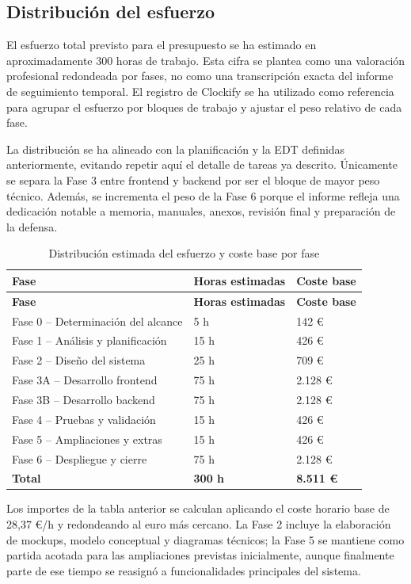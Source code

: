 \subsection{Distribución del esfuerzo}

El esfuerzo total previsto para el presupuesto se ha estimado en aproximadamente 300 horas de trabajo. Esta cifra se plantea como una valoración profesional redondeada por fases, no como una transcripción exacta del informe de seguimiento temporal. El registro de Clockify se ha utilizado como referencia para agrupar el esfuerzo por bloques de trabajo y ajustar el peso relativo de cada fase.

La distribución se ha alineado con la planificación y la EDT definidas anteriormente, evitando repetir aquí el detalle de tareas ya descrito. Únicamente se separa la Fase 3 entre frontend y backend por ser el bloque de mayor peso técnico. Además, se incrementa el peso de la Fase 6 porque el informe refleja una dedicación notable a memoria, manuales, anexos, revisión final y preparación de la defensa.

\begin{longtable}{p{6.5cm}p{3cm}p{3.5cm}}
\caption{Distribución estimada del esfuerzo y coste base por fase}\label{tab:distribucion_esfuerzo}\\
\toprule
\textbf{Fase} & \textbf{Horas estimadas} & \textbf{Coste base} \\
\midrule
\endfirsthead
\toprule
\textbf{Fase} & \textbf{Horas estimadas} & \textbf{Coste base} \\
\midrule
\endhead
\bottomrule
\endlastfoot
Fase 0 -- Determinación del alcance & 5 h & 142 € \\
Fase 1 -- Análisis y planificación & 15 h & 426 € \\
Fase 2 -- Diseño del sistema & 25 h & 709 € \\
Fase 3A -- Desarrollo frontend & 75 h & 2.128 € \\
Fase 3B -- Desarrollo backend & 75 h & 2.128 € \\
Fase 4 -- Pruebas y validación & 15 h & 426 € \\
Fase 5 -- Ampliaciones y extras & 15 h & 426 € \\
Fase 6 -- Despliegue y cierre & 75 h & 2.128 € \\
\midrule
\textbf{Total} & \textbf{300 h} & \textbf{8.511 €} \\
\end{longtable}

Los importes de la tabla anterior se calculan aplicando el coste horario base de 28,37 €/h y redondeando al euro más cercano. La Fase 2 incluye la elaboración de mockups, modelo conceptual y diagramas técnicos; la Fase 5 se mantiene como partida acotada para las ampliaciones previstas inicialmente, aunque finalmente parte de ese tiempo se reasignó a funcionalidades principales del sistema.

